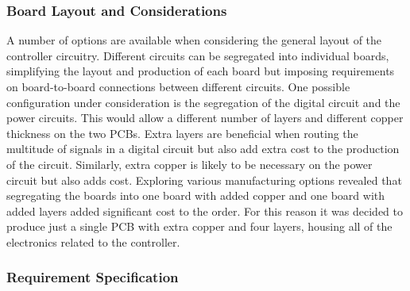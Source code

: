 \subsubsection{Board Layout and Considerations} %
\label{ssub:board_layout_and_considerations}
A number of options are available when considering the general layout of the controller circuitry.
Different circuits can be segregated into individual boards, simplifying the layout and production of each board but imposing requirements on board-to-board connections between different circuits.
One possible configuration under consideration is the segregation of the digital circuit and the power circuits.
This would allow a different number of layers and different copper thickness on the two PCBs.
Extra layers are beneficial when routing the multitude of signals in a digital circuit but also add extra cost to the production of the circuit.
Similarly, extra copper is likely to be necessary on the power circuit but also adds cost.
Exploring various manufacturing options revealed that segregating the boards into one board with added copper and one board with added layers added significant cost to the order.
For this reason it was decided to produce just a single PCB with extra copper and four layers, housing all of the electronics related to the controller.

\clearpage
\subsubsection{Requirement Specification}

